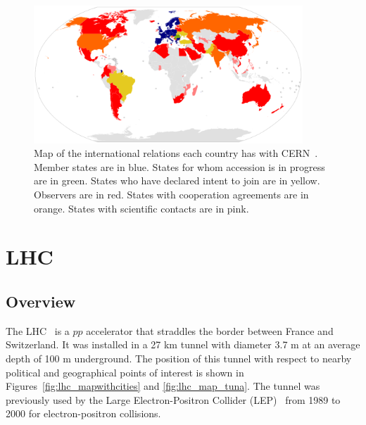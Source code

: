 \begin{figure}[ht]
 \begin{center}
    \includegraphics[width=0.90\textwidth]{figures/experiment/CERN_international_relations_map.pdf}
      \end{center}
\caption{Map of the international relations each country has with CERN~\cite{cern:map}.
Member states are in blue. States for whom accession is in progress are in green.
States who have declared intent to join are in yellow. Observers are in red. States with
cooperation agreements are in orange. States with scientific contacts are in pink.
}
\label{fig:cernmembers}
\end{figure}


\section{LHC\label{sec:LHC}}
\subsection{Overview}
The LHC~\cite{cern-jinst-lhc} is a $pp$ accelerator that straddles the border between France and Switzerland. It was installed in a 27 km tunnel with diameter 3.7 m at an average depth of 100 m underground.
The position of this tunnel with respect to nearby political and geographical points of interest is 
shown in Figures~\ref{fig:lhc_mapwithcities} and \ref{fig:lhc_map_tuna}.
The tunnel was previously
used by the Large Electron-Positron Collider (LEP)~\cite{LEP_DR1979} from 1989 to 2000 for electron-positron collisions.

